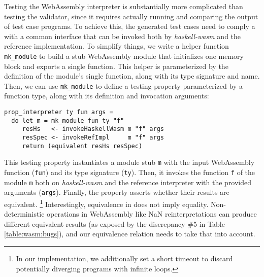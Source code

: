 \documentclass[sigconf,review,anonymous]{acmart}
\begin{document}
Testing the WebAssembly interpreter is substantially more complicated than
testing the validator, since it requires actually running and comparing the
output of test case programs.
%
To achieve this, the generated test cases need to comply a with a common
interface that can be invoked both by \textit{haskell-wasm} and the reference
implementation.
%
To simplify things, we write a helper function \texttt{mk\_module} to build a
stub WebAssembly module that initializes one memory block and exports a single
function.
%
This helper is parameterized by the definition of the module's single function,
along with its type signature and name.
%
%
%
Then, we can use \texttt{mk\_module} to define a testing property parameterized
by a function type, along with its definition and invocation arguments:



\begin{verbatim}
prop_interpreter ty fun args =
  do let m = mk_module fun ty "f"
     resHs   <- invokeHaskellWasm m "f" args
     resSpec <- invokeRefImpl     m "f" args
     return (equivalent resHs resSpec)
\end{verbatim}

This testing property instantiates a module stub \texttt{m} with the input
WebAssembly function (\texttt{fun}) and its type signature (\texttt{ty}).
%
Then, it invokes the function \texttt{f} of the module \texttt{m} both on
\textit{haskell-wasm} and the reference interpreter with the provided arguments
(\texttt{args}).
%
Finally, the property asserts whether their results are equivalent.%
%
\footnote{In our implementation, we additionally set a short timeout to discard
  potentially diverging programs with infinite loops.}
%
Interestingly, equivalence in does not imply equality.
%
Non-deterministic operations in WebAssembly like NaN reinterpretations can
produce different equivalent results (as exposed by the discrepancy \#5 in Table
\ref{table:wasm:bugs}), and our equivalence relation needs to take that into
account.
%
\end{document}
